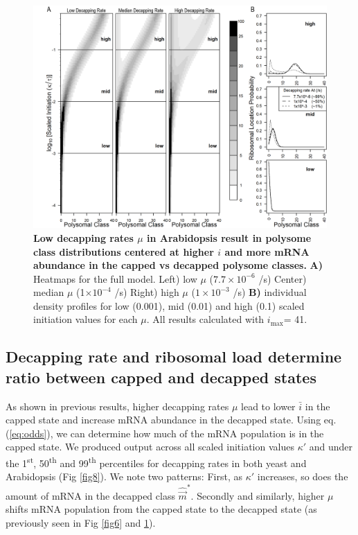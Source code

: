 \documentclass[10pt,letterpaper]{article}
\newcommand{\imax}{\ensuremath{{i_{\max}}}\xspace}
\newcommand{\mvec}{\ensuremath{\vec{m}}\xspace}
\newcommand{\mvechat}{\ensuremath{\hat{\mvec}}\xspace}
\newcommand{\mvechatstar}{\ensuremath{\mvechat^*}\xspace}
\newcommand{\MRL}{\ensuremath{\bar{i}}\xspace}
\begin{document}
\begin{figure}[!h]
\begin{center}
\centering
\includegraphics[width=140mm]{Images/2023-07-09_Figure2_At_Marking_Rate_range_medianlength_with_labels.png}
\caption{{\bf Low decapping rates $\mu$ in Arabidopsis result in polysome class distributions centered at higher $i$ and more mRNA abundance in the capped vs decapped polysome classes.} {\bf  A)}  Heatmaps for the full model. Left) low $\mu$ ($7.7\times 10^{-6}$ /s) Center) median $\mu$ (1$\times 10^{-4}$ /s) Right) high $\mu$ ($1\times 10^{-3}$ /s) {\bf B)} individual density profiles for low (0.001), mid (0.01) and high (0.1) scaled initiation values for each $\mu$. All results calculated with \imax = 41.}
\label{fig7}
\end{center}
\end{figure}



\subsection*{Decapping rate and ribosomal load determine ratio between capped and decapped states}
 As shown in previous results, higher decapping rates $\mu$ lead to lower \MRL in the capped state and increase mRNA abundance in the decapped state.
Using eq. (\ref{eq:odds}), we can determine how much of the mRNA population is in the capped state.
We produced output across all scaled initiation values $\kappa'$ and under the 1\textsuperscript{st}, 50\textsuperscript{th} and 99\textsuperscript{th} percentiles for decapping rates in both yeast and Arabidopsis (Fig \ref{fig8}). 
We note two patterns: First, as $\kappa'$ increases, so does the amount of mRNA in the decapped class  \mvechatstar. 
Secondly and similarly, higher $\mu$ shifts mRNA population from the capped state to the decapped state (as previously seen in Fig \ref{fig6} and \ref{fig7}).  
\end{document}
